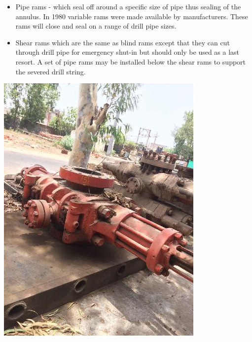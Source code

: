 \begin{itemize}

\item Pipe rams - which seal off around a specific size of pipe thus
sealing of the annulus. In 1980 variable rams were made
available by manufacturers. These rams will close and seal on a
range of drill pipe sizes.

\vspace{1em}

\item Shear rams which are the same as blind rams except that they
can cut through drill pipe for emergency shut-in but should only
be used as a last resort. A set of pipe rams may be installed
below the shear rams to support the severed drill string.

\end{itemize}

\includegraphics[scale=0.5]{images/shear_ram_BOP}




